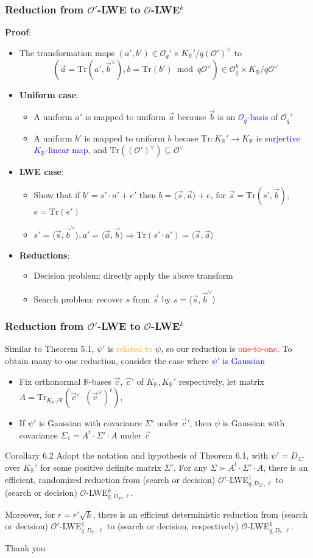 \documentclass{beamer}
\newcommand{\blue}[1]{\textcolor{blue}{#1}}
\newcommand{\dgreen}[1]{\textcolor{dgreen}{#1}}
\newcommand{\orange}[1]{\textcolor{orange}{#1}}
\newcommand{\red}[1]{\textcolor{red}{#1}}
\newcommand{\cO}{\mathcal{O}}
\newcommand{\bbR}{\mathbb{R}}
\newcommand{\Tr}{\mathrm{Tr}}
\newcommand{\TrKRpR}{\mathrm{Tr}_{K_{\mathbb{R}'}/\mathbb{R}}}
\newcommand{\cOV}{\mathcal{O}^{\vee}}
\newcommand{\cOpV}{(\mathcal{O'})^{\vee}}
\newcommand{\KR}{K_{\mathbb{R}}}
\newcommand{\va}{\vec{a}}
\newcommand{\vb}{\vec{b}}
\newcommand{\vc}{\vec{c}}
\newcommand{\vs}{\vec{s}}
\newcommand{\vbV}{\vec{b}^{\vee}}
\newcommand{\vcV}{\vec{c}^{\vee}}
\begin{document}
\frame
{
  \frametitle{Reduction from $\cO'$-LWE to $\cO$-LWE$^k$}
  \textbf{Proof}:
  \begin{itemize}
  	\item The transformation maps $(a',b')\in\cO_q'\times\KR'/q\cOpV$ to
  		\[(\va=\Tr(a',\vbV), b=\Tr(b')\bmod q\cOV)\in\cO_q^k\times\KR/q\cOV\]
  	\item \textbf{Uniform case}:
  		\begin{itemize}
  			\item A \dgreen{uniform} $a'$ is mapped to \dgreen{uniform} $\va$ because $\vb$ is an \blue{$\cO_q$-basis} of $\cO_q'$
  			\item A \dgreen{uniform} $b'$ is mapped to \dgreen{uniform} $b$ becase $\Tr:\KR'\to\KR$ is \blue{surjective $\KR$-linear map}, and $\Tr(\cOpV)\subseteq\cOV$
  		\end{itemize}
  	\item \textbf{LWE case}:
  		\begin{itemize}
  			\item Show that if $b'=s'\cdot a'+e'$ then $b=\langle\vs,\va\rangle+e$, for $\vs=\Tr(s',\vb)$, $e=\Tr(e')$
  			\item $s'=\langle\vs,\vbV\rangle, a'=\langle\va,\vb\rangle\Rightarrow\Tr(s'\cdot a')=\langle\vs,\va\rangle$
  		\end{itemize}
  	\item \textbf{Reductions}:
  		\begin{itemize}
  			\item Decision problem: directly apply the above transform
  			\item Search problem: recover $s$ from $\vs$ by $s=\langle\vs,\vbV\rangle$
  		\end{itemize}
  \end{itemize}
}

\frame
{
  \frametitle{Reduction from $\cO'$-LWE to $\cO$-LWE$^k$}
  Similar to Theorem 5.1, $\psi'$ is \orange{related to} $\psi$, so our reduction is \red{one-to-one}. To obtain \dgreen{many-to-one} reduction, consider the case where \blue{$\psi'$ is Gaussian}
  \begin{itemize}
  	\item Fix orthonormal $\bbR$-bases $\vc$, $\vc'$ of $\KR,\KR'$ respectively, let matrix $A=\TrKRpR(\vc'\cdot(\vcV)^t)$,
  	\item If $\psi'$ is Gaussian with covariance $\Sigma'$ under $\vc'$, then $\psi$ is Gaussian with covariance $\Sigma_1=A^t\cdot\Sigma'\cdot A$ under $\vc$
  \end{itemize}
  \begin{block}{Corollary 6.2}
  Adopt the notation and hypothesis of Theorem 6.1, with $\psi'=D_{\Sigma'}$ over $\KR'$ for some positive definite matrix $\Sigma'$. For any $\Sigma\succ A^t\cdot\Sigma'\cdot A$, there is an \dgreen{efficient, randomized} reduction from (search or decision) $\cO'$-LWE$_{q,D_{\Sigma'},\ell}^1$ to (search or decision) $\cO$-LWE$_{q,D_{\Sigma},\ell}^k$.

  Moreover, for $r=r'\sqrt{k}$, there is an \dgreen{efficient deterministic reduction} from (search or decision) $\cO'$-LWE$_{q,D_{r'},\ell}^1$ to (search or decision, respectively) $\cO$-LWE$_{q,D_{r},\ell}^k$.
  \end{block}
}

\frame
{
	\Huge\center Thank you
}
\end{document}
